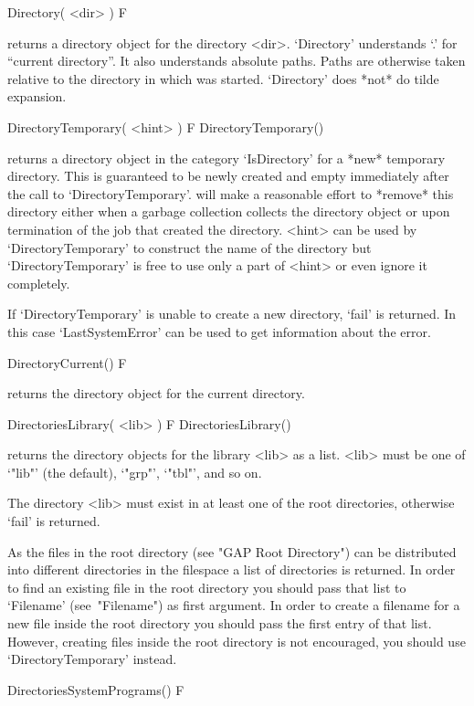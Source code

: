 \>Directory( <dir> ) F

returns  a  directory  object  for  the  directory   <dir>.   `Directory'
understands `.' for ``current directory''. It also  understands  absolute
paths. Paths are otherwise taken  relative  to  the  directory  in  which
{\GAP} was started. `Directory' does *not* do tilde expansion.

\>DirectoryTemporary( <hint> ) F
\)\fmark DirectoryTemporary()

returns  a directory  object in the   category `IsDirectory' for a  *new*
temporary directory.   This is guaranteed to  be  newly created and empty
immediately  after the call to `DirectoryTemporary'.   {\GAP} will make a
reasonable effort   to *remove* this   directory  either  when a  garbage
collection  collects the directory   object  or upon termination  of  the
{\GAP}   job that   created  the  directory.     <hint> can  be  used  by
`DirectoryTemporary' to construct    the  name  of the    directory   but
`DirectoryTemporary' is free to use only a  part of <hint> or even ignore
it completely.

If `DirectoryTemporary' is  unable to create a  new  directory, `fail' is
returned.  In this case `LastSystemError' can be  used to get information
about the error.

\>DirectoryCurrent() F

returns the directory object for the current directory.

\>DirectoriesLibrary( <lib> ) F
\)\fmark DirectoriesLibrary()

returns the  directory objects  for  the  {\GAP}  library <lib> as a list.
<lib> must be one of `"lib"' (the default), `"grp"', `"tbl"', and so on.

The directory <lib> must exist in at  least one of the root directories,
otherwise `fail' is returned.

As the files in the {\GAP} root  directory (see "GAP Root Directory") can
be  distributed  into different  directories in the  filespace  a list of
directories is returned.  In order to find an existing file in the {\GAP}
root directory you should pass that list to `Filename' (see~"Filename")
as first argument.
In order to  create  a filename  for a  new file inside the  {\GAP}  root
directory you   should pass  the first  entry    of that list.   However,
creating files  inside the {\GAP} root  directory is not  encouraged, you
should use `DirectoryTemporary' instead.

\>DirectoriesSystemPrograms() F

